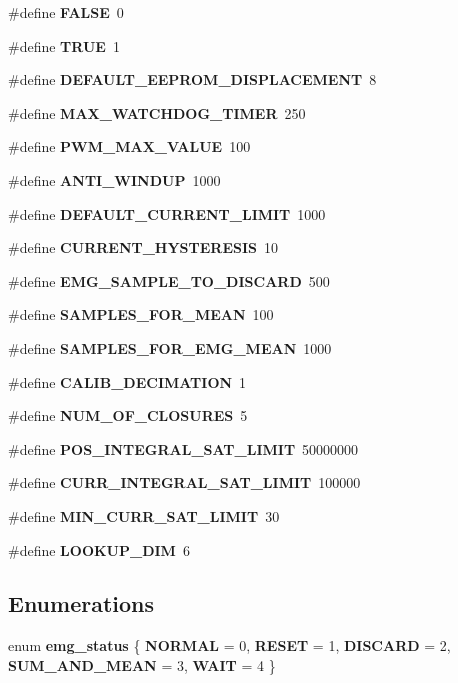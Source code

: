 \begin{DoxyCompactItemize}
\item 
\mbox{\label{globals_8h_aa93f0eb578d23995850d61f7d61c55c1}} 
\#define {\bfseries F\+A\+L\+SE}~0
\item 
\mbox{\label{globals_8h_aa8cecfc5c5c054d2875c03e77b7be15d}} 
\#define {\bfseries T\+R\+UE}~1
\item 
\#define \textbf{ D\+E\+F\+A\+U\+L\+T\+\_\+\+E\+E\+P\+R\+O\+M\+\_\+\+D\+I\+S\+P\+L\+A\+C\+E\+M\+E\+NT}~8
\item 
\#define \textbf{ M\+A\+X\+\_\+\+W\+A\+T\+C\+H\+D\+O\+G\+\_\+\+T\+I\+M\+ER}~250
\item 
\#define \textbf{ P\+W\+M\+\_\+\+M\+A\+X\+\_\+\+V\+A\+L\+UE}~100
\item 
\#define \textbf{ A\+N\+T\+I\+\_\+\+W\+I\+N\+D\+UP}~1000
\item 
\#define \textbf{ D\+E\+F\+A\+U\+L\+T\+\_\+\+C\+U\+R\+R\+E\+N\+T\+\_\+\+L\+I\+M\+IT}~1000
\item 
\#define \textbf{ C\+U\+R\+R\+E\+N\+T\+\_\+\+H\+Y\+S\+T\+E\+R\+E\+S\+IS}~10
\item 
\#define \textbf{ E\+M\+G\+\_\+\+S\+A\+M\+P\+L\+E\+\_\+\+T\+O\+\_\+\+D\+I\+S\+C\+A\+RD}~500
\item 
\#define \textbf{ S\+A\+M\+P\+L\+E\+S\+\_\+\+F\+O\+R\+\_\+\+M\+E\+AN}~100
\item 
\#define \textbf{ S\+A\+M\+P\+L\+E\+S\+\_\+\+F\+O\+R\+\_\+\+E\+M\+G\+\_\+\+M\+E\+AN}~1000
\item 
\mbox{\label{globals_8h_a373fe6bcff3bcd2f3c47359f9e640bf5}} 
\#define {\bfseries C\+A\+L\+I\+B\+\_\+\+D\+E\+C\+I\+M\+A\+T\+I\+ON}~1
\item 
\mbox{\label{globals_8h_a3132fbe7ff2f1850f96481fca447326a}} 
\#define {\bfseries N\+U\+M\+\_\+\+O\+F\+\_\+\+C\+L\+O\+S\+U\+R\+ES}~5
\item 
\#define \textbf{ P\+O\+S\+\_\+\+I\+N\+T\+E\+G\+R\+A\+L\+\_\+\+S\+A\+T\+\_\+\+L\+I\+M\+IT}~50000000
\item 
\#define \textbf{ C\+U\+R\+R\+\_\+\+I\+N\+T\+E\+G\+R\+A\+L\+\_\+\+S\+A\+T\+\_\+\+L\+I\+M\+IT}~100000
\item 
\mbox{\label{globals_8h_a071576950e29c654790153cad12794cb}} 
\#define {\bfseries M\+I\+N\+\_\+\+C\+U\+R\+R\+\_\+\+S\+A\+T\+\_\+\+L\+I\+M\+IT}~30
\item 
\#define \textbf{ L\+O\+O\+K\+U\+P\+\_\+\+D\+IM}~6
\end{DoxyCompactItemize}
\subsection*{Enumerations}
\begin{DoxyCompactItemize}
\item 
enum \textbf{ emg\+\_\+status} \{ \newline
\textbf{ N\+O\+R\+M\+AL} = 0, 
\textbf{ R\+E\+S\+ET} = 1, 
\textbf{ D\+I\+S\+C\+A\+RD} = 2, 
\textbf{ S\+U\+M\+\_\+\+A\+N\+D\+\_\+\+M\+E\+AN} = 3, 
\newline
\textbf{ W\+A\+IT} = 4
 \}
\end{DoxyCompactItemize}
